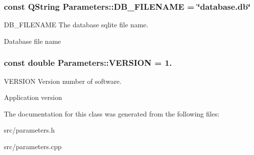 \subsubsection[{D\+B\+\_\+\+F\+I\+L\+E\+N\+A\+M\+E}]{\setlength{\rightskip}{0pt plus 5cm}const Q\+String Parameters\+::\+D\+B\+\_\+\+F\+I\+L\+E\+N\+A\+M\+E = \char`\"{}database.\+db\char`\"{}\hspace{0.3cm}{\ttfamily [static]}}\label{classParameters_a80b98bd51d910bcc2203afcacbc7df87}


D\+B\+\_\+\+F\+I\+L\+E\+N\+A\+M\+E The database sqlite file name. 

Database file name \hypertarget{classParameters_a279ee24140c761de46178daa8960bdc8}{}
\subsubsection[{V\+E\+R\+S\+I\+O\+N}]{\setlength{\rightskip}{0pt plus 5cm}const double Parameters\+::\+V\+E\+R\+S\+I\+O\+N = 1.\hspace{0.3cm}{\ttfamily [static]}}\label{classParameters_a279ee24140c761de46178daa8960bdc8}


V\+E\+R\+S\+I\+O\+N Version number of software. 

Application version 

The documentation for this class was generated from the following files\+:\begin{DoxyCompactItemize}
\item 
src/parameters.\+h\item 
src/parameters.\+cpp\end{DoxyCompactItemize}
